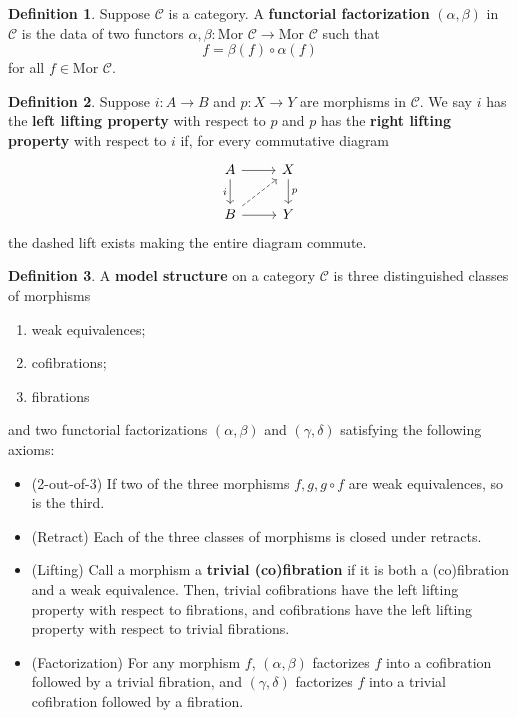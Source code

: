 \documentclass{article}
\theoremstyle{definition}
\theoremstyle{definition}
\newtheorem{definition}{Definition}[theorem]
\theoremstyle{definition}
\theoremstyle{definition}
\theoremstyle{definition}
\theoremstyle{definition}
\theoremstyle{definition}
\begin{document}
\begin{definition}
	Suppose $\mathcal{C}$ is a category. A \textbf{functorial factorization} $(\alpha,\beta)$ in $\mathcal{C}$ is the data of two functors $\alpha,\beta: \textrm{Mor } \mathcal{C}\to  \textrm{Mor }\mathcal{C}$ such that 
	\[f= \beta(f)\circ \alpha(f)\]
	for all $f\in \textrm{Mor } \mathcal{C}$.
\end{definition}

\begin{definition}
	Suppose $i: A\to B$ and $p: X\to Y$ are morphisms in $\mathcal{C}$. We say $i$ has the \textbf{left lifting property} with respect to $p$ and $p$ has the \textbf{right lifting property} with respect to $i$ if, for every commutative diagram 
	\[\begin{tikzcd}
		A & X \\
		B & Y
		\arrow[from=1-1, to=1-2]
		\arrow["i"', from=1-1, to=2-1]
		\arrow["p", from=1-2, to=2-2]
		\arrow[dashed, from=2-1, to=1-2]
		\arrow[from=2-1, to=2-2]
	\end{tikzcd}\]
the dashed lift exists making the entire diagram commute.
 \end{definition}





\begin{definition}
	A \textbf{model structure} on a category $\mathcal{C}$ is three distinguished classes of morphisms
	\begin{enumerate}
		\item weak equivalences;
		\item cofibrations;
		\item fibrations
	\end{enumerate}
	and two functorial factorizations $(\alpha,\beta)$ and $(\gamma,\delta)$ satisfying the following axioms: 
\begin{itemize}
	\item (2-out-of-3) If two of the three morphisms $f,g,g\circ f$ are weak equivalences, so is the third.
	\item (Retract) Each of the three classes of morphisms is closed under retracts. 
	\item (Lifting) Call a morphism a \textbf{trivial (co)fibration} if it is both a (co)fibration and a weak equivalence. Then, trivial cofibrations have the left lifting property with respect to fibrations, and cofibrations have the left lifting property with respect to trivial fibrations.
	\item (Factorization) For any morphism $f$, $(\alpha,\beta)$ factorizes $f$ into a cofibration followed by a trivial fibration, and $(\gamma,\delta)$ factorizes $f$ into a trivial cofibration followed by a fibration.
\end{itemize}

\end{definition}
\end{document}
